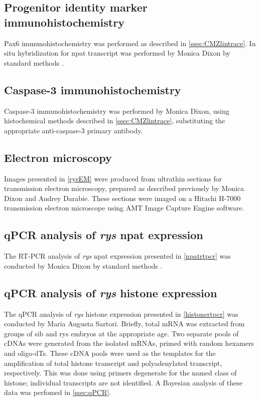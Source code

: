 \subsection{Progenitor identity marker immunohistochemistry}
\label{ssec:rysprogenIHC}
Pax6 immunohistochemistry was performed as described in \autoref{ssec:CMZlintrace}.  In situ hybridization for npat transcript was performed by Monica Dixon by standard methods \cite{Westerfield2000}.

\subsection{Caspase-3 immunohistochemistry}
\label{ssec:ryscaspase}
Caspase-3 immunohistochemistry was performed by Monica Dixon, using histochemical methods described in \autoref{ssec:CMZlintrace}, substituting the appropriate anti-caspase-3 primary antibody.

\subsection{Electron microscopy}
\label{ssec:rysEM}
Images presented in \autoref{rysEM} were produced from ultrathin sections for transmission electron microscopy, prepared as described previously \cite{Lindsey2012} by Monica Dixon and Audrey Darabie. These sections were imaged on a Hitachi H-7000 transmission electron microscope using AMT Image Capture Engine software. 

\subsection{qPCR analysis of \textit{rys} npat expression}
\label{ssec:rysPCR}
The RT-PCR analysis of \textit{rys} npat expression presented in \autoref{npatrtpcr} was conducted by Monica Dixon by standard methods \cite{Sambrook1989}.

\subsection{qPCR analysis of \textit{rys} histone expression}
\label{ssec:rysqPCR}
The qPCR analysis of \textit{rys} histone expression presented in \autoref{histonertpcr} was conducted by Maria Augusta Sartori. Briefly, total mRNA was extracted from groups of sib and rys embryos at the appropriate age. Two separate pools of cDNAs were generated from the isolated mRNAs, primed with random hexamers and oligo-dTs. These cDNA pools were used as the templates for the amplification of total histone transcript and polyadenylated transcript, respectively. This was done using primers degenerate for the named class of histone; individual transcripts are not identified. A Bayesian analysis of these data was perfomed in \autoref{ssec:qPCR}. 

